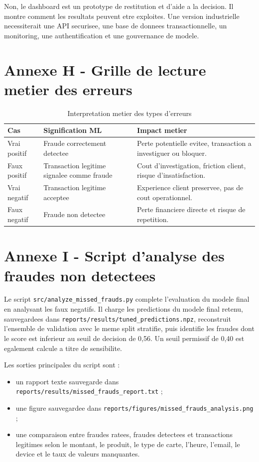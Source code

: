 ﻿\documentclass[12pt,a4paper,oneside]{report}
\begin{document}
Non, le dashboard est un prototype de restitution et d'aide a la decision. Il montre comment les resultats peuvent etre exploites. Une version industrielle necessiterait une API securisee, une base de donnees transactionnelle, un monitoring, une authentification et une gouvernance de modele.

\chapter{Annexe H - Grille de lecture metier des erreurs}

\begin{longtable}{p{4cm}p{5cm}p{6cm}}
\caption{Interpretation metier des types d'erreurs}\\
\toprule
\textbf{Cas} & \textbf{Signification ML} & \textbf{Impact metier} \\
\midrule
Vrai positif & Fraude correctement detectee & Perte potentielle evitee, transaction a investiguer ou bloquer. \\
Faux positif & Transaction legitime signalee comme fraude & Cout d'investigation, friction client, risque d'insatisfaction. \\
Vrai negatif & Transaction legitime acceptee & Experience client preservee, pas de cout operationnel. \\
Faux negatif & Fraude non detectee & Perte financiere directe et risque de repetition. \\
\bottomrule
\end{longtable}

\chapter{Annexe I - Script d'analyse des fraudes non detectees}

Le script \texttt{src/analyze\_missed\_frauds.py} complete l'evaluation du modele final en analysant les faux negatifs. Il charge les predictions du modele final retenu, sauvegardees dans \texttt{reports/results/tuned\_predictions.npz}, reconstruit l'ensemble de validation avec le meme split stratifie, puis identifie les fraudes dont le score est inferieur au seuil de decision de 0,56. Un seuil permissif de 0,40 est egalement calcule a titre de sensibilite.

Les sorties principales du script sont :
\begin{itemize}
    \item un rapport texte sauvegarde dans \texttt{reports/results/missed\_frauds\_report.txt} ;
    \item une figure sauvegardee dans \texttt{reports/figures/missed\_frauds\_analysis.png} ;
    \item une comparaison entre fraudes ratees, fraudes detectees et transactions legitimes selon le montant, le produit, le type de carte, l'heure, l'email, le device et le taux de valeurs manquantes.
\end{itemize}
\end{document}
